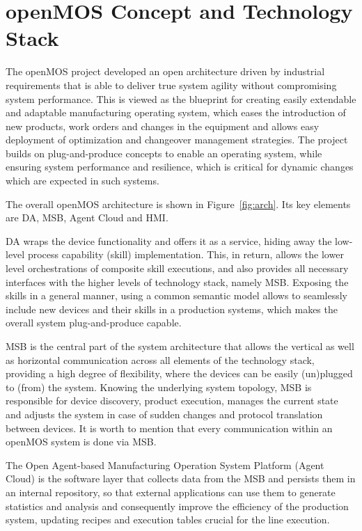 \section{openMOS Concept and Technology Stack}
The \gls{openMOS} project developed an open architecture driven by industrial requirements that is able to deliver true system agility without compromising system performance. 
This is viewed as the blueprint for creating easily extendable and adaptable manufacturing operating system, which eases the introduction of new products, work orders and changes in the equipment and allows easy deployment of optimization and changeover management strategies. 
The project builds on plug-and-produce concepts to enable an operating system, while ensuring system performance and resilience, which is critical for dynamic changes which are expected in such systems.

The overall \gls{openMOS} architecture is shown in Figure~\ref{fig:arch}.
Its key elements are \gls{DA}, \gls{MSB}, Agent Cloud and \gls{HMI}.

\gls{DA} wraps the device functionality and offers it as a service, hiding away the low-level process capability (skill) implementation. 
This, in return, allows the lower level orchestrations of composite skill executions, and also provides all necessary interfaces with the higher levels of technology stack, namely \gls{MSB}.
Exposing the skills in a general manner, using a common semantic model allows to seamlessly include new devices and their skills in a production systems, which makes the overall system plug-and-produce capable. 

\gls{MSB} is the central part of the system architecture that allows the vertical as well as horizontal communication across all elements of the technology stack, providing a high degree of flexibility, where the devices can be easily (un)plugged to (from) the system. 
Knowing the underlying system topology, \gls{MSB} is responsible for device discovery, product execution, manages the current state and adjusts the system in case of sudden changes and protocol translation between devices.
It is worth to mention that every communication within an \gls{openMOS} system is done via \gls{MSB}.

The Open Agent-based Manufacturing Operation System Platform (Agent Cloud) is the software layer that collects data from the MSB and persists them in an internal repository, so that external applications can use them to generate statistics and analysis and consequently improve the efficiency of the production system, updating recipes and execution tables crucial for the line execution.

